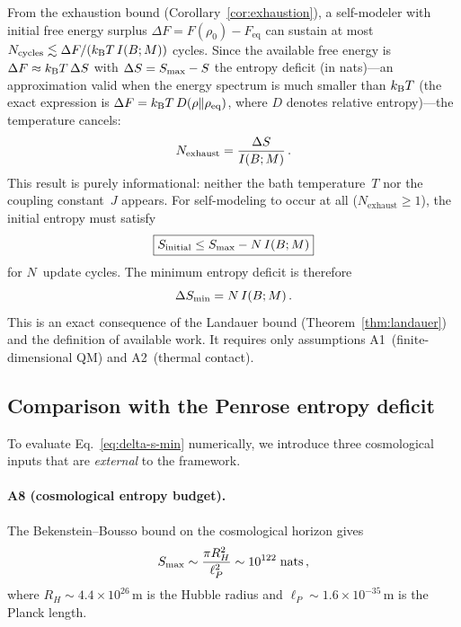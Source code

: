 From the exhaustion bound (Corollary~\ref{cor:exhaustion}), a
self-modeler with initial free energy surplus
$\Delta F = F(\rho_0) - F_{\mathrm{eq}}$ can sustain at most
$N_{\mathrm{cycles}} \lesssim \Delta F / (k_{\mathrm{B}} T\,I(B;M))$
cycles.  Since the available free energy is
$\Delta F \approx k_{\mathrm{B}} T\,\Delta S$ with
$\Delta S = S_{\max} - S$ the entropy deficit (in nats)---an
approximation valid when the energy spectrum is much smaller
than $k_{\mathrm{B}} T$ (the exact expression is
$\Delta F = k_{\mathrm{B}} T\,D(\rho\|\rho_{\mathrm{eq}})$, where $D$
denotes relative entropy)---the temperature cancels:
\begin{equation}
  N_{\mathrm{exhaust}} = \frac{\Delta S}{I(B;M)} \,.
  \label{eq:n-exhaust}
\end{equation}
This result is purely informational: neither the bath temperature~$T$
nor the coupling constant~$J$ appears.  For self-modeling to occur at
all ($N_{\mathrm{exhaust}} \geq 1$), the initial entropy must satisfy
\begin{equation}
  \boxed{S_{\mathrm{initial}} \leq S_{\max} - N\,I(B;M)}
  \label{eq:s-initial-bound}
\end{equation}
for $N$~update cycles.  The minimum entropy deficit is therefore
\begin{equation}
  \Delta S_{\min} = N\,I(B;M) \,.
  \label{eq:delta-s-min}
\end{equation}
This is an exact consequence of the Landauer bound
(Theorem~\ref{thm:landauer}) and the definition of available work.
It requires only assumptions A1~(finite-dimensional QM) and
A2~(thermal contact).

\subsection{Comparison with the Penrose entropy deficit}
\label{sec:penrose}

To evaluate Eq.~\eqref{eq:delta-s-min} numerically, we introduce
three cosmological inputs that are \emph{external} to the framework.

\paragraph{A8 (cosmological entropy budget).}
The Bekenstein--Bousso bound on the cosmological horizon gives
\begin{equation}
  S_{\max} \sim \frac{\pi R_H^2}{\ell_P^2} \sim 10^{122}\;\text{nats}\,,
  \label{eq:smax-cosmo}
\end{equation}
where $R_H \sim 4.4\times 10^{26}\,\text{m}$ is the Hubble radius
and $\ell_P \sim 1.6\times 10^{-35}\,\text{m}$ is the Planck
length.

